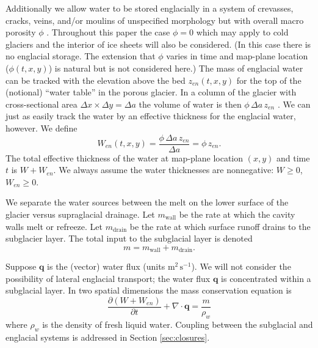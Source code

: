 \documentclass[11pt,final]{amsart}
\newcommand\bq{\mathbf{q}}
\newcommand{\Div}{\nabla\cdot}
\begin{document}
Additionally we allow water to be stored englacially in a system of crevasses, cracks, veins, and/or moulins of unspecified morphology but with overall macro porosity $\phi$ \citep{Bartholomausetal2011}.  Throughout this paper the case $\phi=0$ which may apply to cold glaciers and the interior of ice sheets will also be considered.  (In this case there is no englacial storage.  The extension that $\phi$ varies in time and map-plane location ($\phi(t,x,y)$) is natural but is not considered here.)  The mass of englacial water can be tracked with the elevation above the bed $z_{en}(t,x,y)$ for the top of the (notional) ``water table'' in the porous glacier.  In a column of the glacier with cross-sectional area $\Delta x \times \Delta y = \Delta a$ the volume of water is then $\phi\, \Delta a \, z_{en}$ \citep{Bartholomausetal2011}.  We can just as easily track the water by an effective thickness for the englacial water, however.  We define
\begin{equation}
W_{en}(t,x,y) = \frac{\phi\, \Delta a\, z_{en}}{\Delta a} = \phi\, z_{en}. \label{eq:definezen}
\end{equation}
The total effective thickness of the water at map-plane location $(x,y)$ and time $t$ is $W+W_{en}$.  We always assume the water thicknesses are nonnegative: $W \ge 0$, $W_{en} \ge 0$.

We separate the water sources between the melt on the lower surface of the glacier versus supraglacial drainage.  Let $m_{\text{wall}}$ be the rate at which the cavity walls melt or refreeze.  Let $m_{\text{drain}}$ be the rate at which surface runoff drains to the subglacier layer.  The total input to the subglacial layer is denoted
\begin{equation}
m = m_{\text{wall}} + m_{\text{drain}}. \label{eq:totalinput}
\end{equation}

Suppose $\bq$ is the (vector) water flux (units $\text{m}^2\,\text{s}^{-1}$).  We will not consider the possibility of lateral englacial transport; the water flux $\bq$ is concentrated within a subglacial layer.  In two spatial dimensions the mass conservation equation is \citep{Clarke05}
\begin{equation} \label{eq:conserve}
\frac{\partial (W + W_{en})}{\partial t} + \Div \bq = \frac{m}{\rho_w}
\end{equation}
where $\rho_w$ is the density of fresh liquid water.  Coupling between the subglacial and englacial systems is addressed in Section \ref{sec:closures}.
\end{document}
